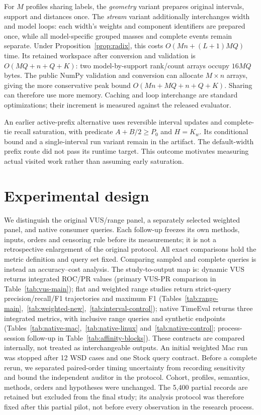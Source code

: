 For $M$ profiles sharing labels, the \emph{geometry} variant prepares original
intervals, support and distances once. The \emph{stream} variant additionally
interchanges width and model loops: each width's weights and component
identifiers are prepared once, while all model-specific grouped masses and
complete events remain separate. Under Proposition~\ref{prop:radix}, this costs
$O(Mn+(L+1)MQ)$ time. Its retained workspace after conversion and validation is
$O(MQ+n+Q+K)$: two model-by-support rank/count arrays occupy $16MQ$ bytes.
The public NumPy validation and conversion can allocate $M\times n$ arrays,
giving the more conservative peak bound $O(Mn+MQ+n+Q+K)$. Sharing can therefore
use more memory. Caching and loop interchange are standard optimizations; their
increment is measured against the released evaluator.

An earlier active-prefix alternative uses reversible interval updates and
complete-tie recall saturation, with predicate $A+B/2\ge P_0$ and $H=K_w$.
Its conditional bound and a single-interval run variant remain in the artifact.
The default-width prefix route did not pass its runtime target. This outcome
motivates measuring actual visited work rather than assuming early saturation.



\section{Experimental design}
\label{sec:design}
We distinguish the original VUS/range panel, a separately selected weighted
panel, and native consumer queries. Each follow-up freezes its own methods,
inputs, orders and censoring rule before its measurements; it is not a
retrospective enlargement of the original protocol. All exact comparisons
hold the metric definition and query set fixed. Comparing sampled and complete
queries is instead an accuracy--cost analysis.
The study-to-output map is: dynamic VUS returns integrated ROC/PR values
(primary VUS-PR comparison in Table~\ref{tab:vus-main}); flat and weighted range
studies return strict-query precision/recall/F1 trajectories and maximum F1
(Tables~\ref{tab:range-main},~\ref{tab:weighted-new},~\ref{tab:interval-control});
native TimeEval returns three integrated metrics, with inclusive range queries
and synthetic endpoints (Tables~\ref{tab:native-mac},~\ref{tab:native-linux}
and~\ref{tab:native-control}; process-session follow-up in
Table~\ref{tab:affinity-blocks}).
These contracts are compared internally, not treated as interchangeable outputs.
An initial weighted Mac run was stopped after 12 WSD cases and one Stock
query contract. Before a complete rerun, we separated paired-order timing
uncertainty from recording sensitivity and bound the independent auditor in
the protocol. Cohort, profiles, semantics, methods, orders and hypotheses were
unchanged. The 5,400 partial records are retained but excluded from the final
study; its analysis protocol was therefore fixed after this partial pilot,
not before every observation in the research process.

